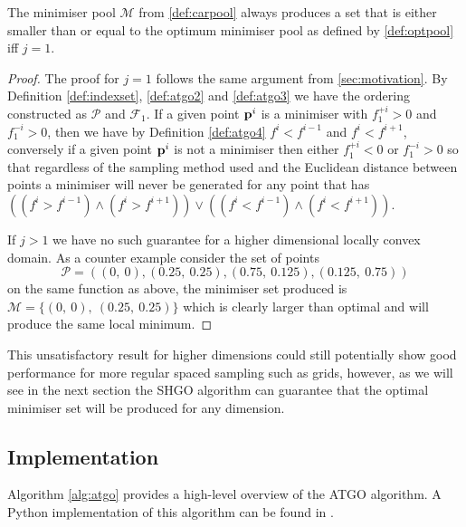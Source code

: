 \begin{theorem} \label{theorem:iff1}
The minimiser pool $\mathcal{M}$ from \autoref{def:carpool} always produces a set that is either smaller than or equal to the optimum minimiser pool as defined by \autoref{def:optpool} iff $j = 1$.
\end{theorem}
\begin{proof}
The proof for $j = 1$ follows the same argument from \autoref{sec:motivation}. By Definition \ref{def:indexset}, \ref{def:atgo2} and \ref{def:atgo3} we have the ordering constructed as $\mathcal{P}$ and $\mathcal{F}_1$. If a given point $\bold{p}^i$ is a minimiser with $f_1^{+i} > 0$ and $f_1^{-i} > 0$, then we have by Definition \ref{def:atgo4} $f^i < f^{i - 1}$ and $f^i < f^{i + 1}$, conversely if a given point $\bold{p}^i$ is not a minimiser then either $f_1^{+i} < 0$ or $f_1^{-i} > 0$ so that regardless of the sampling method used and the Euclidean distance between points a minimiser will never be generated for any point that has $\left((f^i > f^{i - 1}) \land (f^i > f^{i + 1} )\right) \lor \left(( f^i < f^{i - 1}) \land (f^i < f^{i + 1} ) \right)$.

If $j > 1$ we have no such guarantee for a higher dimensional locally convex domain. As a counter example consider the set of points $$\mathcal{P} = \left( (0,~0), (0.25,~0.25), (0.75,~0.125), (0.125,~0.75)\right)$$ on the same function as above, the minimiser set produced is $\mathcal{M} = \{(0,~0),~(0.25,~0.25)\}$ which is clearly larger than optimal and will produce the same local minimum. %
\end{proof}

This unsatisfactory result for higher dimensions could still potentially show good performance for more regular spaced sampling such as grids, however, as we will see in the next section the SHGO algorithm can guarantee that the optimal minimiser set will be produced for any dimension. 


\subsection{Implementation}
Algorithm \ref{alg:atgo} provides a high-level overview of the ATGO algorithm. A Python implementation of this algorithm can be found in \cite{SHGOpy}. 


